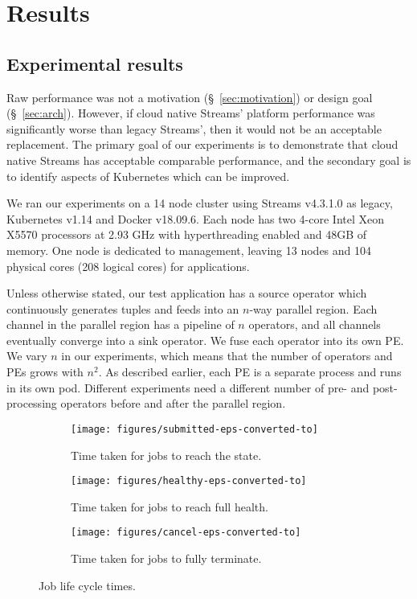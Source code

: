 \section{Results}
\label{sec:results}

\subsection{Experimental results}

Raw performance was not a motivation (\S~\ref{sec:motivation}) or design goal
(\S~\ref{sec:arch}). However, if cloud native Streams' platform performance was
significantly worse than legacy Streams', then it would not be an acceptable
replacement. The primary goal of our experiments is to demonstrate that cloud
native Streams has acceptable comparable performance, and the secondary goal is
to identify aspects of Kubernetes which can be improved.

We ran our experiments on a 14 node cluster using Streams v4.3.1.0 as legacy,
Kubernetes v1.14 and Docker v18.09.6. Each node has two 4-core Intel Xeon X5570
processors at 2.93 GHz with hyperthreading enabled and 48GB of memory.  One
node is dedicated to management, leaving 13 nodes and 104 physical cores (208
logical cores) for applications.

Unless otherwise stated, our test application has a source operator which
continuously generates tuples and feeds into an $n$-way parallel region. Each
channel in the parallel region has a pipeline of $n$ operators, and all
channels eventually converge into a sink operator. We fuse each operator into
its own PE. We vary $n$ in our experiments, which means that the number of
operators and PEs grows with $n^2$. As described earlier, each PE is a separate
process and runs in its own pod. Different experiments need a different number
of pre- and post-processing operators before and after the parallel region.

\begin{figure}
\centering
\begin{subfigure}{1.0\linewidth}
  \centering
  \texttt{[image: figures/submitted-eps-converted-to]}
  \caption{Time taken for jobs to reach the  state.}
  \label{fig:submit-cancel-submitted}
\end{subfigure}
\begin{subfigure}{1.0\linewidth}
  \centering
  \texttt{[image: figures/healthy-eps-converted-to]}
  \caption{Time taken for jobs to reach full health.}
  \label{fig:submit-cancel-healthy}
\end{subfigure}
\begin{subfigure}{1.0\linewidth}
  \centering
  \texttt{[image: figures/cancel-eps-converted-to]}
  \caption{Time taken for jobs to fully terminate.}
  \label{fig:submit-cancel-terminate}
\end{subfigure}
\caption{Job life cycle times.}
\label{fig:submit-cancel}
\end{figure}


